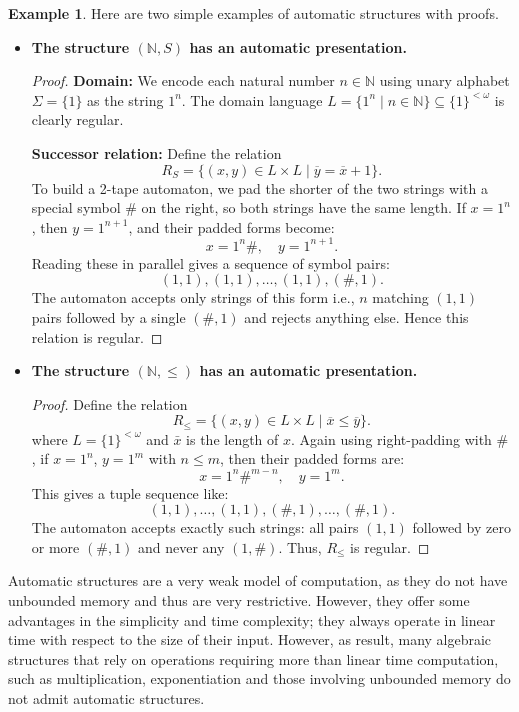\documentclass{pracalicmgr2025}
\theoremstyle{plain}            %
\theoremstyle{remark}           %
\theoremstyle{definition}       %
\newtheorem{example}[theorem]{Example}
\begin{document}
\begin{example}
 Here are two simple examples of automatic structures with proofs.  
\begin{itemize}
   \item \textbf{The structure $(\mathbb{N}, S)$ has an automatic presentation.}
    \begin{proof}
        \textbf{Domain:} We encode each natural number $n \in \mathbb{N}$ using unary alphabet $\Sigma = \{1\}$ as the string $1^n$. The domain language $L = \{1^n \mid n \in \mathbb{N}\} \subseteq \{1\}^{<\omega}$ is clearly regular.

        \textbf{Successor relation:} Define the relation 
        $$
        R_S = \{(x, y) \in L \times L \mid \overline{y} = \overline{x} + 1\}.
        $$
        To build a 2-tape automaton, we pad the shorter of the two strings with a special symbol $\#$ on the right, so both strings have the same length. If $x = 1^n$, then $y = 1^{n+1}$, and their padded forms become:
        $$
        x = 1^n\#, \quad y = 1^{n+1}.
        $$
        Reading these in parallel gives a sequence of symbol pairs:
        $$
        (1,1), (1,1), \dots, (1,1), (\#,1).
        $$
        The automaton accepts only strings of this form i.e., $n$ matching $(1,1)$ pairs followed by a single $(\#,1)$ and rejects anything else. Hence this relation is regular.
    \end{proof}

    \item \textbf{The structure $(\mathbb{N}, \le)$ has an automatic presentation.}
    \begin{proof}
        Define the relation 
        $$
        R_\le = \{(x, y) \in L \times L \mid \overline{x} \le \overline{y}\}.
        $$
        where $L = \{1\}^{<\omega}$ and $\bar x$ is the length of $x$.
        Again using right-padding with $\#$, if $x = 1^n$, $y = 1^m$ with $n \le m$, then their padded forms are:
        $$
        x = 1^n\#^{m-n}, \quad y = 1^m.
        $$
        This gives a tuple sequence like:
        $$
        (1,1), \dots, (1,1), (\#,1), \dots, (\#,1).
        $$
        The automaton accepts exactly such strings: all pairs $(1,1)$ followed by zero or more $(\#,1)$ and never any $(1,\#)$. Thus, $R_\le$ is regular.
    \end{proof}
    \end{itemize}
    \end{example}


 Automatic structures are a very weak model of computation, as they do not have unbounded memory and thus are very restrictive. However, they offer some advantages in the simplicity and time complexity; they always operate in linear time with respect to the size of their input. However, as result, many algebraic structures that rely on operations requiring more than linear time computation, such as multiplication, exponentiation and those involving unbounded memory do not admit automatic structures. 
 
\end{document}
